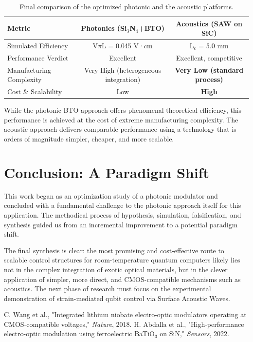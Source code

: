 \documentclass[12pt, a4paper, numbers]{report}
\begin{document}
\begin{table}[htbp]
\caption{Final comparison of the optimized photonic and the acoustic platforms.}
\label{tab:final_comp}
\centering
\begin{tabular}{lcc}
\toprule
\textbf{Metric} & \textbf{Photonics (Si$_3$N$_4$+BTO)} & \textbf{Acoustics (SAW on SiC)} \\
\midrule
Simulated Efficiency & V$\pi$L = 0.045 V·cm & L$_c$ = 5.0 mm \\
Performance Verdict & Excellent & Excellent, competitive \\
Manufacturing Complexity & Very High (heterogeneous integration) & \textbf{Very Low (standard process)} \\
Cost \& Scalability & Low & \textbf{High} \\
\bottomrule
\end{tabular}
\end{table}

While the photonic BTO approach offers phenomenal theoretical efficiency, this performance is achieved at the cost of extreme manufacturing complexity. The acoustic approach delivers comparable performance using a technology that is orders of magnitude simpler, cheaper, and more scalable.

\section{Conclusion: A Paradigm Shift}
This work began as an optimization study of a photonic modulator and concluded with a fundamental challenge to the photonic approach itself for this application. The methodical process of hypothesis, simulation, falsification, and synthesis guided us from an incremental improvement to a potential paradigm shift.

The final synthesis is clear: the most promising and cost-effective route to scalable control structures for room-temperature quantum computers likely lies not in the complex integration of exotic optical materials, but in the clever application of simpler, more direct, and CMOS-compatible mechanisms such as acoustics. The next phase of research must focus on the experimental demonstration of strain-mediated qubit control via Surface Acoustic Waves.


\begin{thebibliography}{9}
C. Wang et al., "Integrated lithium niobate electro-optic modulators operating at CMOS-compatible voltages," \textit{Nature}, 2018.
H. Abdalla et al., "High-performance electro-optic modulation using ferroelectric BaTiO$_3$ on SiN," \textit{Sensors}, 2022.
\end{thebibliography}

\end{document}
